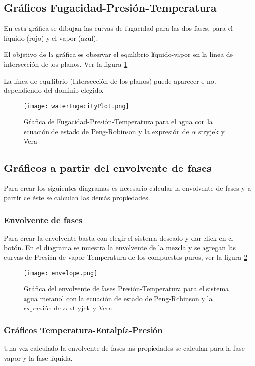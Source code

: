 	\subsection{Gráficos Fugacidad-Presión-Temperatura}\label{subsec:fpt}

		En esta gráfica se dibujan las curvas de fugacidad para las dos fases, para el líquido (rojo) y el vapor (azul).

		El objetivo de la gráfica es observar el equilibrio líquido-vapor en la línea de intersección de los planos. Ver la figura \ref{fig:fugplot}.

		La línea de equilibrio (Intersección de los planos) puede aparecer o no, dependiendo del dominio elegido.

		\begin{figure}[H]
			\texttt{[image: waterFugacityPlot.png]}
			\caption{Gŕafica de Fugacidad-Presión-Temperatura para el agua con la ecuación de estado de Peng-Robinson y la expresión de $\alpha$ stryjek y Vera}
			\label{fig:fugplot}
		\end{figure}

	\subsection{Gráficos a partir del envolvente de fases}\label{subsec:envelope}
		Para crear los siguientes diagramas es necesario calcular la envolvente de fases y a partir de éste se calculan las demás propiedades.

	\subsubsection{Envolvente de fases}
		Para crear la envolvente basta con elegir el sistema deseado y dar click en el botón. En el diagrama se muestra la envolvente de la mezcla y se agregan las curvas de Presión de vapor-Temperatura de los compuestos puros, ver la figura \ref{fig:envelope}
		\begin{figure}[H]
			\texttt{[image: envelope.png]}
			\caption{Gráfica del envolvente de fases Presión-Temperatura para el sistema  agua metanol con la ecuación de estado de Peng-Robinson y la expresión de $\alpha$ stryjek y Vera}
			\label{fig:envelope}
		\end{figure}

	\subsubsection{Gráficos Temperatura-Entalpía-Presión}\label{subsec:tep}
		Una vez calculado la envolvente de fases las propiedades se calculan para la fase vapor y la fase líquida.

